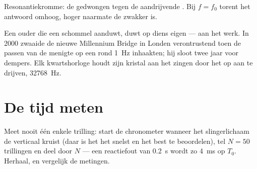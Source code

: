 \begin{omfigure}

{\small Resonantiekromme: de gedwongen  tegen de aandrijvende
. Bij $f = f_0$ torent het antwoord omhoog, hoger naarmate de
 zwakker is.}
\end{omfigure}

\begin{example}\label{ex:g12:oscillators-and-time:resonance-zoo}
Een ouder die een schommel aanduwt, duwt op diens eigen  ---
 aan het werk. In \num{2000} zwaaide de nieuwe Millennium Bridge in
Londen verontrustend toen de passen van de menigte op een 
rond \qty{1}{Hz} inhaakten; hij sloot twee jaar voor dempers. Elk
kwartshorloge houdt zijn kristal aan het zingen door het op  aan te
drijven, \qty{32768}{Hz}.
\end{example}

\section{De tijd meten}

\begin{method}\label{met:g12:oscillators-and-time:timing}
Meet nooit één enkele trilling: start de chronometer wanneer het
slingerlichaam de verticaal kruist (daar is het het snelst en het best te
beoordelen), tel $N = 50$ trillingen en deel door $N$ --- een reactiefout van
\qty{0.2}{s} wordt zo \qty{4}{ms} op $T_0$. Herhaal, en vergelijk de
metingen.
\end{method}

